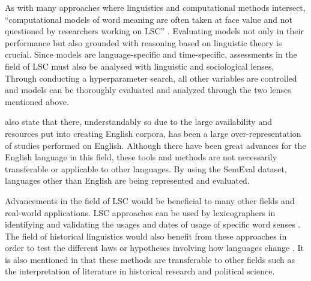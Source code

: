As with many approaches where linguistics and computational methods intersect, “computational models of word meaning are often taken at face value and not questioned by researchers working on LSC” \citep{hengchen2021challenges}. Evaluating models not only in their performance but also grounded with reasoning based on linguistic theory is crucial. Since models are language-specific and time-specific, assessments in the field of LSC must also be analysed with linguistic and sociological lenses. Through conducting a hyperparameter search, all other variables are controlled and models can be thoroughly evaluated and analyzed through the two lenses mentioned above. 

\citet{hengchen2021challenges} also state that there, understandably so due to the large availability and resources put into creating English corpora, has been a large over-representation of studies performed on English. Although there have been great advances for the English language in this field, these tools and methods are not necessarily transferable or applicable to other languages. By using the SemEval dataset, languages other than English are being represented and evaluated. 

Advancements in the field of LSC would be beneficial to many other fields and real-world applications. LSC approaches can be used by lexicographers in identifying and validating the usages and dates of usage of specific word senses \citep{lau-etal-2012-word, falk-etal-2014-non, klosa-2018-newgerman}. The field of historical linguistics would also benefit from these approaches in order to test the different laws or hypotheses involving how languages change \citep{hamilton-etal-2016-diachronic, Xu2015ACE}. It is also mentioned in \citet{hengchen2021challenges} that these methods are transferable to other fields such as the interpretation of literature in historical research and political science.  


